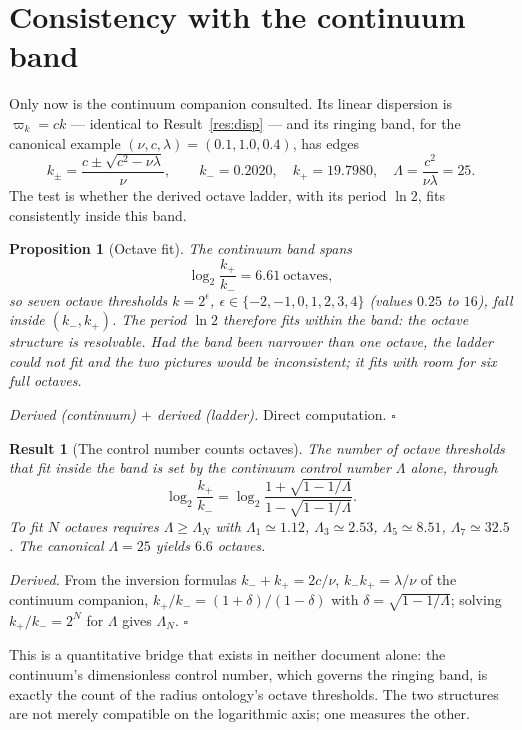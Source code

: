 \documentclass[11pt,a4paper]{article}
\newtheorem{theorem}{Result}
\newtheorem{proposition}{Proposition}
\begin{document}
\section{Consistency with the continuum band}\label{sec:consistency}

Only now is the continuum companion consulted. Its linear dispersion is $\varpi_k=ck$ --- identical to Result~\ref{res:disp} --- and its ringing band, for the canonical example $(\nu,c,\lambda)=(0.1,1.0,0.4)$, has edges
\[
k_\pm=\frac{c\pm\sqrt{c^2-\nu\lambda}}{\nu},\qquad k_-=0.2020,\quad k_+=19.7980,\quad \Lambda=\frac{c^2}{\nu\lambda}=25 .
\]
The test is whether the derived octave ladder, with its period $\ln 2$, fits consistently inside this band.

\begin{proposition}[Octave fit]\label{res:fit}
The continuum band spans
\[
\log_2\!\frac{k_+}{k_-}=6.61\ \text{octaves},
\]
so seven octave thresholds $k=2^\epsilon$, $\epsilon\in\{-2,-1,0,1,2,3,4\}$ (values $0.25$ to $16$), fall inside $(k_-,k_+)$. The period $\ln 2$ therefore fits within the band: the octave structure is resolvable. Had the band been narrower than one octave, the ladder could not fit and the two pictures would be inconsistent; it fits with room for six full octaves.
\end{proposition}

\emph{Derived (continuum) $+$ derived (ladder).} Direct computation. \hfill$\square$

\begin{theorem}[The control number counts octaves]\label{res:count}
The number of octave thresholds that fit inside the band is set by the continuum control number $\Lambda$ alone, through
\[
\log_2\frac{k_+}{k_-}=\log_2\frac{1+\sqrt{1-1/\Lambda}}{1-\sqrt{1-1/\Lambda}} .
\]
To fit $N$ octaves requires $\Lambda\ge \Lambda_N$ with $\Lambda_1\simeq1.12$, $\Lambda_3\simeq2.53$, $\Lambda_5\simeq8.51$, $\Lambda_7\simeq32.5$. The canonical $\Lambda=25$ yields $6.6$ octaves.
\end{theorem}

\emph{Derived.} From the inversion formulas $k_-+k_+=2c/\nu$, $k_-k_+=\lambda/\nu$ of the continuum companion, $k_+/k_-=(1+\delta)/(1-\delta)$ with $\delta=\sqrt{1-1/\Lambda}$; solving $k_+/k_-=2^N$ for $\Lambda$ gives $\Lambda_N$. \hfill$\square$

This is a quantitative bridge that exists in neither document alone: the continuum's dimensionless control number, which governs the ringing band, is exactly the count of the radius ontology's octave thresholds. The two structures are not merely compatible on the logarithmic axis; one measures the other.
\end{document}
